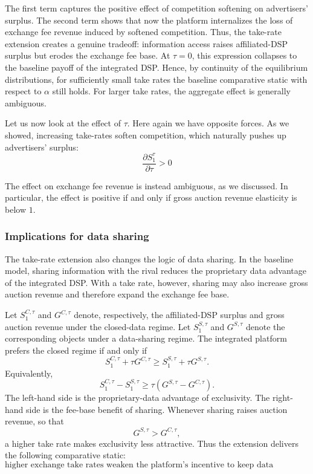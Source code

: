 \documentclass[11pt]{article}
\theoremstyle{plain}
\theoremstyle{definition}
\theoremstyle{plain}
\theoremstyle{plain}
\theoremstyle{plain}
\theoremstyle{plain}
\numberwithin{equation}{section}
\begin{document}
\noindent The first term captures the positive effect of competition softening on advertisers' surplus. The second term shows that now the platform internalizes the loss of exchange fee revenue induced by softened competition. Thus, the take-rate extension creates a genuine tradeoff: information access raises affiliated-DSP surplus but erodes the exchange fee base. At $ \tau = 0 $, this expression collapses to the baseline payoff of the integrated DSP. Hence, by continuity of the equilibrium distributions, for sufficiently small take rates the baseline comparative static with respect to $ \alpha $ still holds. For larger take rates, the aggregate effect is generally ambiguous.

Let us now look at the effect of $ \tau $. Here again we have opposite forces. As we showed, increasing take-rates soften competition, which naturally pushes up advertisers' surplus:
\[
\frac{\partial S_1^\tau}{\partial \tau} > 0
\]

\noindent The effect on exchange fee revenue is instead ambiguous, as we discussed. In particular, the effect is positive if and only if gross auction revenue elasticity is below $ 1 $.

\subsubsection{Implications for data sharing}

The take-rate extension also changes the logic of data sharing. In the baseline model, sharing
information with the rival reduces the proprietary data advantage of the integrated DSP. With a
take rate, however, sharing may also increase gross auction revenue and therefore expand the
exchange fee base.

Let $S_1^{C,\tau}$ and $G^{C,\tau}$ denote, respectively, the affiliated-DSP surplus and gross auction
revenue under the closed-data regime. Let $S_1^{S,\tau}$ and $G^{S,\tau}$ denote the corresponding
objects under a data-sharing regime. The integrated platform prefers the closed regime if and only if
\[
S_1^{C,\tau}+\tau G^{C,\tau}
\ge
S_1^{S,\tau}+\tau G^{S,\tau}.
\]
Equivalently,
\[
S_1^{C,\tau}-S_1^{S,\tau}
\ge
\tau\left(G^{S,\tau}-G^{C,\tau}\right).
\]
The left-hand side is the proprietary-data advantage of exclusivity. The right-hand side is the
fee-base benefit of sharing. Whenever sharing raises auction revenue, so that
\[
G^{S,\tau}>G^{C,\tau},
\]
a higher take rate makes exclusivity less attractive. Thus the extension delivers the following
comparative static:
\[
\text{higher exchange take rates weaken the platform's incentive to keep data exclusive.}
\]
\end{document}

